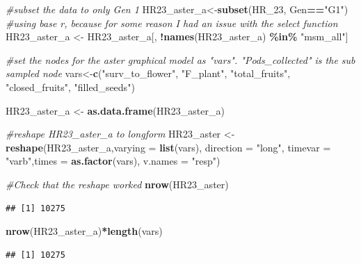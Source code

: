 \documentclass[
]{article}
\newenvironment{Shaded}{\begin{snugshade}}{\end{snugshade}}
\newcommand{\AttributeTok}[1]{\textcolor[rgb]{0.13,0.29,0.53}{#1}}
\newcommand{\CommentTok}[1]{\textcolor[rgb]{0.56,0.35,0.01}{\textit{#1}}}
\newcommand{\FunctionTok}[1]{\textcolor[rgb]{0.13,0.29,0.53}{\textbf{#1}}}
\newcommand{\NormalTok}[1]{#1}
\newcommand{\OtherTok}[1]{\textcolor[rgb]{0.56,0.35,0.01}{#1}}
\newcommand{\SpecialCharTok}[1]{\textcolor[rgb]{0.81,0.36,0.00}{\textbf{#1}}}
\newcommand{\StringTok}[1]{\textcolor[rgb]{0.31,0.60,0.02}{#1}}
\begin{document}
\begin{Shaded}
\begin{Highlighting}[]
\CommentTok{\#subset the data to only Gen 1}
\NormalTok{HR23\_aster\_a}\OtherTok{\textless{}{-}}\FunctionTok{subset}\NormalTok{(HR\_23, Gen}\SpecialCharTok{==}\StringTok{"G1"}\NormalTok{)}
\CommentTok{\#using base r, because for some reason I had an issue with the select function}
\NormalTok{HR23\_aster\_a }\OtherTok{\textless{}{-}}\NormalTok{ HR23\_aster\_a[, }\SpecialCharTok{!}\FunctionTok{names}\NormalTok{(HR23\_aster\_a) }\SpecialCharTok{\%in\%} \StringTok{"msm\_all"}\NormalTok{]}

\CommentTok{\#set the nodes for the aster graphical model as "vars". "Pods\_collected" is the sub sampled node }
\NormalTok{vars}\OtherTok{\textless{}{-}}\FunctionTok{c}\NormalTok{(}\StringTok{"surv\_to\_flower"}\NormalTok{, }\StringTok{"F\_plant"}\NormalTok{, }\StringTok{"total\_fruits"}\NormalTok{, }\StringTok{"closed\_fruits"}\NormalTok{, }\StringTok{"filled\_seeds"}\NormalTok{)}

\NormalTok{HR23\_aster\_a }\OtherTok{\textless{}{-}} \FunctionTok{as.data.frame}\NormalTok{(HR23\_aster\_a)}

\CommentTok{\#reshape HR23\_aster\_a to longform}
\NormalTok{HR23\_aster }\OtherTok{\textless{}{-}} \FunctionTok{reshape}\NormalTok{(HR23\_aster\_a,}\AttributeTok{varying =} \FunctionTok{list}\NormalTok{(vars), }\AttributeTok{direction =} \StringTok{"long"}\NormalTok{, }\AttributeTok{timevar =} \StringTok{"varb"}\NormalTok{,}\AttributeTok{times =} \FunctionTok{as.factor}\NormalTok{(vars), }\AttributeTok{v.names =} \StringTok{"resp"}\NormalTok{)}

\CommentTok{\#Check that the reshape worked }
\FunctionTok{nrow}\NormalTok{(HR23\_aster)}
\end{Highlighting}
\end{Shaded}

\begin{verbatim}
## [1] 10275
\end{verbatim}

\begin{Shaded}
\begin{Highlighting}[]
\FunctionTok{nrow}\NormalTok{(HR23\_aster\_a)}\SpecialCharTok{*}\FunctionTok{length}\NormalTok{(vars)}
\end{Highlighting}
\end{Shaded}

\begin{verbatim}
## [1] 10275
\end{verbatim}
\end{document}
